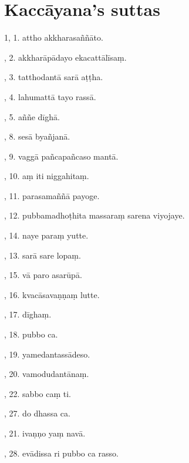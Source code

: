 \cleardoublepage
{}
{}
\chapter*{Kaccāyana's suttas}

1, 1. attho akkharasaññāto.\hfill \pageref{sut:1}\par {}, 2. akkharāpādayo ekacattālīsaṃ.\hfill \pageref{sut:2}\par {}, 3. tatthodantā sarā aṭṭha.\hfill \pageref{sut:3}\par {}, 4. lahumattā tayo rassā.\hfill \pageref{sut:4}\par {}, 5. aññe dīghā.\hfill \pageref{sut:5}\par {}, 8. sesā byañjanā.\hfill \pageref{sut:6}\par {}, 9. vaggā pañcapañcaso mantā.\hfill \pageref{sut:7}\par {}, 10. aṃ iti niggahitaṃ.\hfill \pageref{sut:8}\par {}, 11. parasamaññā payoge.\hfill \pageref{sut:9}\par {}, 12. pubbamadhoṭhita massaraṃ sarena viyojaye.\hfill \pageref{sut:10}\par {}, 14. naye paraṃ yutte.\hfill \pageref{sut:11}\par {}, 13. sarā sare lopaṃ.\hfill \pageref{sut:12}\par {}, 15. vā paro asarūpā.\hfill \pageref{sut:13}\par {}, 16. kvacāsavaṇṇaṃ lutte.\hfill \pageref{sut:14}\par {}, 17. dīghaṃ.\hfill \pageref{sut:15}\par {}, 18. pubbo ca.\hfill \pageref{sut:16}\par {}, 19. yamedantassādeso.\hfill \pageref{sut:17}\par {}, 20. vamodudantānaṃ.\hfill \pageref{sut:18}\par {}, 22. sabbo caṃ ti.\hfill \pageref{sut:19}\par {}, 27. do dhassa ca.\hfill \pageref{sut:20}\par {}, 21. ivaṇṇo yaṃ navā.\hfill \pageref{sut:21}\par {}, 28. evādissa ri pubbo ca rasso.\hfill \pageref{sut:22}\par \noindent

